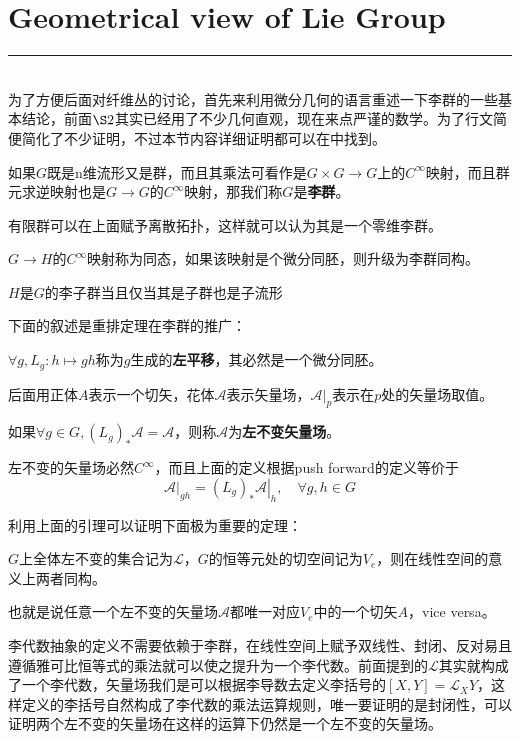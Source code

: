 \section*{Geometrical view of Lie Group}
{\color{red}\hrule}
\hspace*{\fill} \\%
为了方便后面对纤维丛的讨论，首先来利用微分几何的语言重述一下李群的一些基本结论，前面$\S2$其实已经用了不少几何直观，现在来点严谨的数学。为了行文简便简化了不少证明，不过本节内容详细证明都可以在\cite{lcb}中找到。
\begin{definition}
	如果$G$既是n维流形又是群，而且其乘法可看作是$G\times G\to G$上的$C^\infty$映射，而且群元求逆映射也是$G\to G$的$C^\infty$映射，那我们称$G$是\textbf{李群}。
\end{definition}
\begin{example}
	有限群可以在上面赋予离散拓扑，这样就可以认为其是一个零维李群。
\end{example}
\begin{definition}[同态/同构]
	$G\to H$的$C^\infty$映射称为同态，如果该映射是个微分同胚，则升级为李群同构。
\end{definition}
\begin{definition}
	$H$是$G$的李子群当且仅当其是子群也是子流形
\end{definition}
下面的叙述是重排定理在李群的推广：
\begin{theorem}[重排定理]
	$\forall g,L_g:h\mapsto gh$称为$g$生成的\textbf{左平移}，其必然是一个微分同胚。
\end{theorem}
后面用正体$A$表示一个切矢，花体$\mathscr{A}$表示矢量场，$\mathscr{A}|_p$表示在$p$处的矢量场取值。
\begin{definition}
	如果$\forall g\in G, \left(L_g\right)_*\mathscr{A}=\mathscr{A}$，则称$\mathscr{A}$为\textbf{左不变矢量场}。
\end{definition}
\begin{lemma}
	左不变的矢量场必然$C^\infty$，而且上面的定义根据push forward的定义等价于\[\left.\mathscr{A}\right|_{gh}=\left.(L_g)_*\mathscr{A}\right|_{h},\quad\forall g,h\in G\]
\end{lemma}
利用上面的引理可以证明下面极为重要的定理：
\begin{theorem}
	$G$上全体左不变的集合记为$\mathscr{L}$，$G$的恒等元处的切空间记为$V_e$，则在线性空间的意义上两者同构。
\end{theorem}
也就是说任意一个左不变的矢量场$\mathscr{A}$都唯一对应$V_e$中的一个切矢$A$，vice versa。

李代数抽象的定义不需要依赖于李群，在线性空间上赋予双线性、封闭、反对易且遵循雅可比恒等式的乘法就可以使之提升为一个李代数。前面提到的$\mathscr{L}$其实就构成了一个李代数，矢量场我们是可以根据李导数去定义李括号的$[X,Y]=\mathcal{L}_XY$，这样定义的李括号自然构成了李代数的乘法运算规则，唯一要证明的是封闭性，可以证明两个左不变的矢量场在这样的运算下仍然是一个左不变的矢量场。

